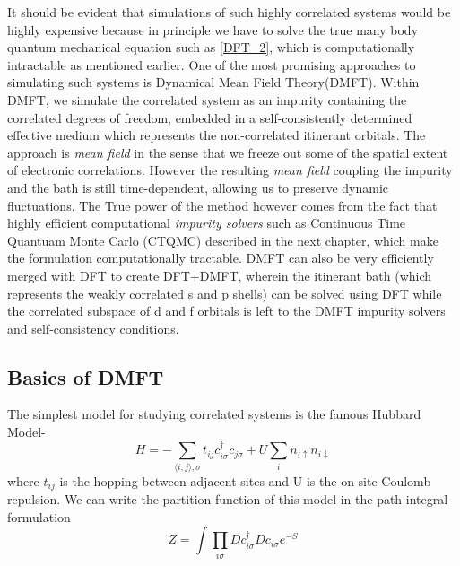 \documentclass[12pt,letter]{article}
\newcommand{\la}{\langle}
\newcommand{\ra}{\rangle}
\newcommand{\cdag}{c^{\dagger}}
\newcommand{\upa}{\uparrow}
\newcommand{\dow}{\downarrow}
\newcommand{\sig}{\sigma}
\begin{document}
It should be evident that simulations of such highly correlated systems would be highly expensive because in principle we have to solve the true many body quantum mechanical equation such as \ref{DFT_2}, which is computationally intractable as mentioned earlier. One of the most promising approaches to simulating such systems is Dynamical Mean Field Theory(DMFT). Within DMFT, we simulate the correlated system as an impurity containing the correlated degrees of freedom, embedded in a self-consistently determined effective medium which represents the non-correlated itinerant orbitals. The approach is \textit{mean field} in the sense that we freeze out some of the spatial extent of electronic correlations. However the resulting \textit{mean field} coupling the impurity and the bath is still time-dependent, allowing us to preserve dynamic fluctuations. The True power of the method however comes from the fact that highly efficient computational \textit{impurity solvers} such as Continuous Time Quantuam Monte Carlo (CTQMC) described in the next chapter, which make the formulation computationally tractable. DMFT can also be very efficiently merged with DFT to create DFT+DMFT, wherein the itinerant bath (which represents the weakly correlated s and p shells) can be solved using DFT while the correlated subspace of d and f orbitals is left to the DMFT impurity solvers and self-consistency conditions.

\subsection{Basics of DMFT}

The simplest model for studying correlated systems is the famous Hubbard Model-
\begin{equation}
H=- \sum_{\la i,j \ra, \sigma} t_{ij} \cdag_{i \sigma} c_{j\sigma} + U \sum_{i} n_{i\upa} n_{i \dow}
\end{equation}
 where $t_{ij} $ is the hopping between adjacent sites and U is the on-site Coulomb repulsion.  We can write the partition function of this model in the path integral formulation 
 \begin{equation}\label{Part}
 Z=\int \prod_{i\sig} D \cdag_{i\sig} D c_{i\sig} e^{-S}
 \end{equation}
\end{document}
